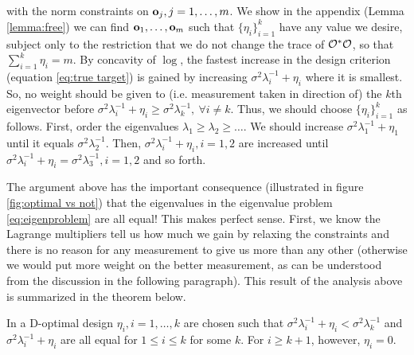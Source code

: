 \documentclass{amsart}
\numberwithin{equation}{section}
\begin{document}
with the norm constraints on $\mathbf{o}_j,j=1,\dots,m$. We show in the
appendix (Lemma \ref{lemma:free}) we can find $\mathbf{o}_1,\dots,\mathbf{o}_m$
such that $\{\eta_i\}_{i=1}^k$ have any value we desire, subject only
to the restriction that we do not change the trace of $\mathcal{O}^*\mathcal{O}$, so
that $\sum_{i=1}^k \eta_i = m$. By concavity of $\log$, the fastest
increase in the design criterion (equation \eqref{eq:true target}) is
gained by increasing $\sigma^2\lambda_i^{-1} + \eta_i$ where it is
smallest. So, no weight should be given to (i.e. measurement taken in
direction of) the $k$th eigenvector before $\sigma^2\lambda_i^{-1} +
\eta_i \geq \sigma^2\lambda_k^{-1},\ \forall i \neq k$. Thus, we
should choose $\{\eta_i\}_{i=1}^k$ as follows. First, order the
eigenvalues $\lambda_1 \geq \lambda_2 \geq \dots$. We should increase
$\sigma^2 \lambda_1^{-1} + \eta_1$ until it equals
$\sigma^2\lambda_2^{-1}$. Then, $\sigma^2 \lambda_i^{-1} + \eta_i,i=1,2$ are
increased until $\sigma^2 \lambda_i^{-1} + \eta_i =
\sigma^2\lambda_3^{-1},i=1,2$ and so forth.

The argument above has the important consequence (illustrated in
figure \ref{fig:optimal vs not}) that the eigenvalues in the
eigenvalue problem \eqref{eq:eigenproblem} are all equal! This makes
perfect sense. First, we know the Lagrange multipliers tell us how
much we gain by relaxing the constraints and there is no reason for
any measurement to give us more than any other (otherwise we would put
more weight on the better measurement, as can be understood from the
discussion in the following paragraph). This result of the analysis
above is summarized in the theorem below.

\begin{theorem}\label{thm:char}
In a D-optimal design $\eta_i, i=1,\dots,k$ are chosen such that
$\sigma^2\lambda_i^{-1} + \eta_i < \sigma^2\lambda_k^{-1}$ and
$\sigma^2\lambda_i^{-1} + \eta_i$ are all equal for $1 \leq i \leq k$
for some $k$. For $i \geq k+1$, however, $\eta_i = 0$.
\end{theorem}

\end{document}
